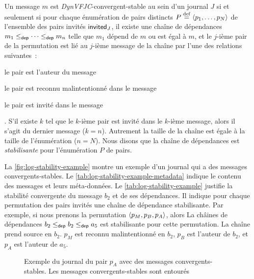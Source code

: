 Un message $m$ est \emph{DynVFJC}-convergent-stable au sein d'un journal $J$ si et seulement si pour chaque énumération de pairs distincts $P \defeq \tuple{p_1, \dotsc, p_N}$ de l'ensemble des pairs invités $\trm{invited}_J$, il existe une chaîne de dépendances $m_1 \depeq \dotsb \depeq m_n$ telle que $m_1$ dépend de $m$ ou est égal à $m$, et le $j$-ième pair de la permutation est lié au $j$-ième message de la chaîne par l'une des relations suivantes~: \begin{inlinelist}
    \item le pair est l'auteur du message
    \item le pair est reconnu malintentionné dans le message
    \item le pair est invité dans le message
\end{inlinelist}.
S'il existe $k$ tel que le $k$-ième pair est invité dans le $k$-ième message, alors il s'agit du dernier message ($k = n$).
Autrement la taille de la chaîne est égale à la taille de l'énumération ($n = N$).
Nous disons que la chaîne de dépendances est \emph{stabilisante} pour l'énumération $P$ de pairs.

La \autoref{fig:log-stability-example} montre un exemple d'un journal qui a des messages convergents-stables.
Le \autoref{tab:log-stability-example-metadata} indique le contenu des messages et leurs méta-données.
Le \autoref{tab:log-stability-example} justifie la stabilité convergente du message $b_2$ et de ses dépendances.
Il indique pour chaque permutation des pairs invités une chaîne de dépendance stabilisante.
Par exemple, si nous prenons la permutation $\tuple*{p_M, p_B, p_A}$, alors La châines de dépendances $b_2 \depeq b_2 \depeq a_5$ est stabilisante pour cette permutation.
La chaîne prend source en $b_2$.
$p_M$ est reconnu malintentionné en $b_2$, $p_B$ est l'auteur de $b_2$, et $p_A$ est l'auteur de $a_5$.


\begin{figure}[hbt]
\centering
{}
\caption[Journal du pair $p_A$ avec des messages convergents-stables]{Exemple du journal du pair $p_A$ avec des messages convergents-stables.
Les messages convergents-stables sont entourés}\label{fig:log-stability-example}
\end{figure}

